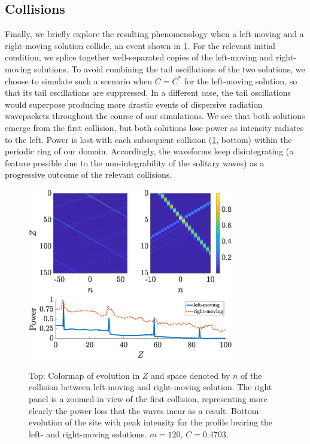\documentclass[reprint, amsmath,amssymb,aps,pre]{revtex4-2}
\begin{document}

\subsection{Collisions}\label{sec:collisions}

Finally, we briefly explore the resulting phenomenology when a left-moving and a right-moving solution collide, an event shown in \cref{fig:collision1}. For the
relevant initial condition, we splice together well-separated copies of the left-moving and right-moving solutions. To avoid combining the tail oscillations of the two solutions, we choose to simulate such a scenario when $C=C^*$ for the left-moving solution, so that its tail oscillations are suppressed. 
In a different case, the tail oscillations would superpose producing
more drastic events of dispersive radiation wavepackets throughout the course
of our simulations.
We see that both solutions emerge from the first collision, but both solutions lose power as intensity radiates to the left. Power is lost with each subsequent collision (\cref{fig:collision1}, bottom) within the periodic ring of our domain. Accordingly,
the waveforms keep disintegrating (a feature possible due to the non-integrability
of the solitary waves) as a progressive outcome of the relevant collisions.

\begin{figure}
    \centering
    \includegraphics[width=9cm]{images/collision1.eps}
    \includegraphics[width=9cm]{images/collision1power.eps}
    \caption{Top: Colormap of evolution in $Z$ and space denoted by $n$ of the collision between left-moving and right-moving solution. The right panel is a zoomed-in view of the first collision, representing more clearly the power loss that the waves incur as
    a result. Bottom: evolution  of the site with peak intensity for the profile bearing the left- and right-moving solutions.
    $m=120$, $C=0.4703$.}
    \label{fig:collision1}
\end{figure}
\end{document}
